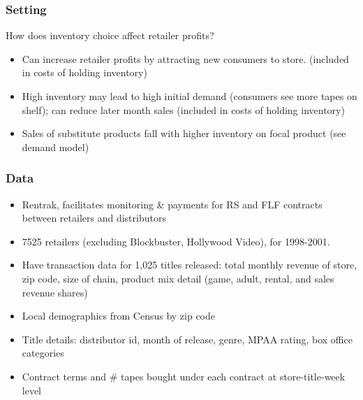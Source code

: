 \documentclass[notes=show]{beamer}
\begin{document}

\begin{frame}
\frametitle{Setting}

How does inventory choice affect retailer profits?

\begin{itemize}
\item Can increase retailer profits by attracting new consumers to store.
(included in costs of holding inventory)

\item High inventory may lead to high initial demand (consumers see more
tapes on shelf); can reduce later month sales (included in costs of holding
inventory)

\item Sales of substitute products fall with higher inventory on focal
product (see demand model)
\end{itemize}
\end{frame}


\begin{frame}
\frametitle{Data}

\begin{itemize}
\item Rentrak, facilitates monitoring \& payments for RS and FLF contracts
between retailers and distributors

\item 7525 retailers (excluding Blockbuster, Hollywood Video), for 1998-2001.

\item Have transaction data for 1,025 titles released: total monthly revenue
of store, zip code, size of chain, product mix detail (game, adult, rental,
and sales revenue shares)

\item Local demographics from Census by zip code

\item Title details: distributor id, month of release, genre, MPAA rating,
box office categories

\item Contract terms and \# tapes bought under each contract at
store-title-week level
\end{itemize}
\end{frame}

\end{document}
